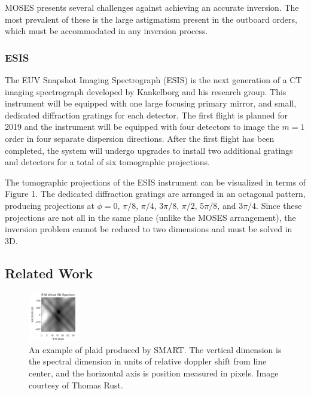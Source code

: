 \documentclass[10pt, letter]{article}
\begin{document}
				MOSES presents several challenges against achieving an accurate inversion. The most prevalent of these is the large astigmatism present in the outboard orders, which must be accommodated in any inversion process. 

			\subsubsection{ESIS} \label{esis_intro}
			
				The EUV Snapshot Imaging Spectrograph (ESIS) is the next generation of a CT imaging spectrograph developed by Kankelborg and his research group. This instrument will be equipped with one large focusing primary mirror, and small, dedicated diffraction gratings for each detector. The first flight is planned for 2019 and the instrument will be equipped with four detectors to image the $m=1$ order in four separate dispersion directions. After the first flight has been completed, the system will undergo upgrades to install two additional gratings and detectors for a total of six tomographic projections. 
				
				The tomographic projections of the ESIS instrument can be visualized in terms of Figure 1. The dedicated diffraction gratings are arranged in an octagonal pattern, producing projections at $\phi = 0$, $\pi/8$, $\pi/4$, $3 \pi / 8$, $\pi /2$, $5 \pi /8$, and $3 \pi /4$. Since these projections are not all in the same plane (unlike the MOSES arrangement), the inversion problem cannot be reduced to two dimensions and must be solved in 3D.
			
		\subsection{Related Work} \label{pwork}
		
					\begin{figure}
						\centering
							\includegraphics[width=0.2\textwidth]{figures/plaid}
						\caption{An example of plaid produced by SMART. The vertical dimension is the spectral dimension in units of relative doppler shift from line center, and the horizontal axis is position measured in pixels. Image courtesy of Thomas Rust.}
						\label{plaid}
					\end{figure}
			
\end{document}

